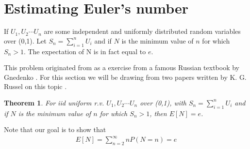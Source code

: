 \documentclass[12pt]{article}
\numberwithin{equation}{section}
\newtheorem{theorem}{Theorem}[section]
\begin{document}
\section{Estimating Euler's number}
If $U_1, U_2 \cdots U_n$ are some independent and uniformly distributed random variables over (0,1). Let $S_n=\sum_{i=1}^n U_i$ and if $N$ is the minimum value of $n$ for which $S_n>1$. The expectation of N is in fact equal to $e$.
\par This problem originated from as a exercise from a famous Russian textbook by Gnedenko \cite{gnedenko}. For this section we will be drawing from two papers written by K. G. Russel on this topic \cite{simplerussell, russell_1983}.
\begin{theorem}
For iid uniform r.v. $U_1, U_2 \cdots U_n$ over (0,1), with $S_n=\sum_{i=1}^n U_i$ and if $N$ is the minimum value of $n$ for which $S_n>1$, then $E[N]=e$.
\end{theorem}
    Note that our goal is to show that 
\begin{align}   
    E[N]=\sum_{n=2}^{\infty}n P(N=n) = e
\end{align}
\end{document}
